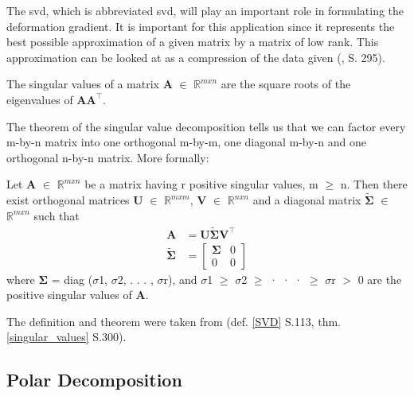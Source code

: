 The \acrlong{svd}, which is abbreviated \acrshort{svd}, will play an important role in formulating the deformation gradient. It is important for this application since it represents the best possible approximation of a given matrix by a matrix of low rank. This approximation can be looked at as a compression of the data given (\cite{LiesenMehrmann2015}, S. 295).

\begin{definition}
\label{singular_values}
The singular values of a matrix $\mathbf{A}$ $\in$ $\mathbb{R}^{m x n}$ are the square roots of the eigenvalues of $\mathbf{AA}^{\intercal}$.
\end{definition}

The theorem of the singular value decomposition tells us that we can factor every m-by-n matrix into one orthogonal m-by-m, one diagonal m-by-n and one orthogonal n-by-n matrix. More formally:

\begin{theorem}
\label{SVD}
Let $\mathbf{A}$ $\in$ $\mathbb{R}^{m x n}$ be a matrix having r positive singular values, m $\geq$ n. Then there exist orthogonal matrices $\mathbf{U}$ $\in$ $\mathbb{R}^{m x m}$, $\mathbf{V}$ $\in$ $\mathbb{R}^{n x n}$ and a diagonal matrix $\mathbf{\tilde{\Sigma}}$ $\in$ $\mathbb{R}^{m x n}$ such that
\begin{align*}
\mathbf{A} &= \mathbf{U \tilde{\Sigma} V^\intercal} \\
\mathbf{\tilde{\Sigma}} &= \left[ \begin{array}{cc} \mathbf{\Sigma} & 0 \\ 0 & 0 \end{array} \right]
\end{align*}
where $\mathbf{\Sigma}$ = diag ($\sigma$1, $\sigma$2, . . . , $\sigma$r), and $\sigma$1 $\geq$ $\sigma$2 $\geq$ · · · $\geq$ $\sigma$r $>$ 0 are the positive singular values of $\mathbf{A}$.

\end{theorem}
The definition and theorem were taken from \cite{ford2014numerical} (def. \ref{SVD} S.113, thm. \ref{singular_values} S.300).




\subsection{Polar Decomposition}

